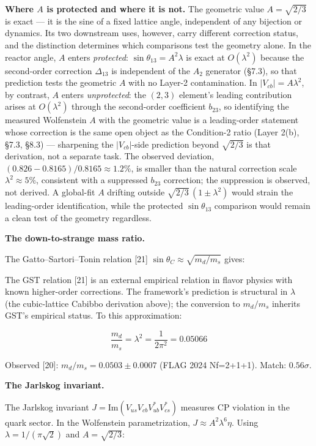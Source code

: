 \documentclass[
]{article}
\begin{document}
\textbf{Where \(A\) is protected and where it is not.} The geometric
value \(A = \sqrt{2/3}\) is exact --- it is the sine of a fixed lattice
angle, independent of any bijection or dynamics. Its two downstream
uses, however, carry different correction status, and the distinction
determines which comparisons test the geometry alone. In the reactor
angle, \(A\) enters \emph{protected}: \(\sin\theta_{13} = A^2\lambda\)
is exact at \(O(\lambda^2)\) because the second-order correction
\(\Delta_{13}\) is independent of the \(A_2\) generator (§7.3), so that
prediction tests the geometric \(A\) with no Layer-2 contamination. In
\(|V_{cb}| = A\lambda^2\), by contrast, \(A\) enters \emph{unprotected}:
the \((2,3)\) element's leading contribution arises at \(O(\lambda^2)\)
through the second-order coefficient \(b_{23}\), so identifying the
measured Wolfenstein \(A\) with the geometric value is a leading-order
statement whose correction is the same open object as the Condition-2
ratio (Layer 2(b), §7.3, §8.3) --- sharpening the \(|V_{cb}|\)-side
prediction beyond \(\sqrt{2/3}\) is that derivation, not a separate
task. The observed deviation, \((0.826 - 0.8165)/0.8165 \approx 1.2\%\),
is smaller than the natural correction scale \(\lambda^2 \approx 5\%\),
consistent with a suppressed \(b_{23}\) correction; the suppression is
observed, not derived. A global-fit \(A\) drifting outside
\(\sqrt{2/3}\,(1 \pm \lambda^2)\) would strain the leading-order
identification, while the protected \(\sin\theta_{13}\) comparison would
remain a clean test of the geometry regardless.

\textbf{The down-to-strange mass ratio.}

The Gatto--Sartori--Tonin relation {[}21{]}
\(\sin\theta_C \approx \sqrt{m_d/m_s}\) gives:

The GST relation {[}21{]} is an external empirical relation in flavor
physics with known higher-order corrections. The framework's prediction
is structural in \(\lambda\) (the cubic-lattice Cabibbo derivation
above); the conversion to \(m_d/m_s\) inherits GST's empirical status.
To this approximation:

\[\boxed{\frac{m_d}{m_s} = \lambda^2 = \frac{1}{2\pi^2} = 0.05066}\]

Observed {[}20{]}: \(m_d/m_s = 0.0503 \pm 0.0007\) (FLAG 2024 Nf=2+1+1).
Match: \(0.56\sigma\).

\textbf{The Jarlskog invariant.}

The Jarlskog invariant \(J = \text{Im}(V_{us}V_{cb}V^*_{ub}V^*_{cs})\)
measures CP violation in the quark sector. In the Wolfenstein
parametrization, \(J \approx A^2\lambda^6\eta\). Using
\(\lambda = 1/(\pi\sqrt{2})\) and \(A = \sqrt{2/3}\):
\end{document}
